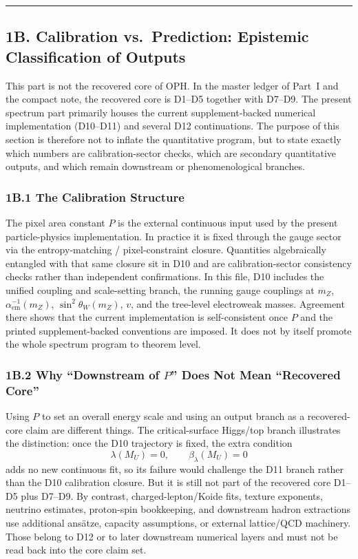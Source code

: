 \begin{center}\rule{0.5\linewidth}{0.5pt}\end{center}

\subsection{1B. Calibration vs.\ Prediction: Epistemic Classification of Outputs}\label{1b-calibration-vs-prediction}

This part is not the recovered core of OPH. In the master ledger of Part~I and the compact note, the recovered core is D1--D5 together with D7--D9. The present spectrum part primarily houses the current supplement-backed numerical implementation (D10--D11) and several D12 continuations. The purpose of this section is therefore not to inflate the quantitative program, but to state exactly which numbers are calibration-sector checks, which are secondary quantitative outputs, and which remain downstream or phenomenological branches.

\subsubsection{1B.1 The Calibration Structure}\label{1b1-the-calibration-structure}

The pixel area constant \(P\) is the external continuous input used by the present particle-physics implementation. In practice it is fixed through the gauge sector via the entropy-matching / pixel-constraint closure. Quantities algebraically entangled with that same closure sit in D10 and are calibration-sector consistency checks rather than independent confirmations. In this file, D10 includes the unified coupling and scale-setting branch, the running gauge couplings at \(m_Z\), \(\alpha_{\mathrm{em}}^{-1}(m_Z)\), \(\sin^2\theta_W(m_Z)\), \(v\), and the tree-level electroweak masses. Agreement there shows that the current implementation is self-consistent once \(P\) and the printed supplement-backed conventions are imposed. It does not by itself promote the whole spectrum program to theorem level.

\subsubsection{1B.2 Why ``Downstream of \(P\)'' Does Not Mean ``Recovered Core''}\label{1b2-dimensionless-independence}

Using \(P\) to set an overall energy scale and using an output branch as a recovered-core claim are different things. The critical-surface Higgs/top branch illustrates the distinction: once the D10 trajectory is fixed, the extra condition
\[
\lambda(M_U)=0,\qquad \beta_\lambda(M_U)=0
\]
adds no new continuous fit, so its failure would challenge the D11 branch rather than the D10 calibration closure. But it is still not part of the recovered core D1--D5 plus D7--D9. By contrast, charged-lepton/Koide fits, texture exponents, neutrino estimates, proton-spin bookkeeping, and downstream hadron extractions use additional ans\"atze, capacity assumptions, or external lattice/QCD machinery. Those belong to D12 or to later downstream numerical layers and must not be read back into the core claim set.

